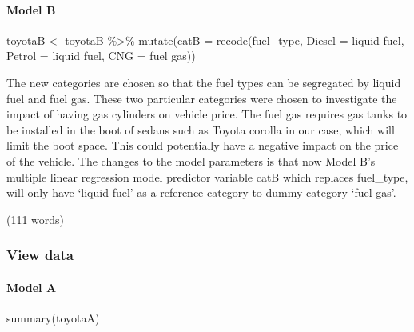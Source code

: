 \documentclass[
]{article}
\newenvironment{Shaded}{\begin{snugshade}}{\end{snugshade}}
\newcommand{\AttributeTok}[1]{\textcolor[rgb]{0.77,0.63,0.00}{#1}}
\newcommand{\FunctionTok}[1]{\textcolor[rgb]{0.00,0.00,0.00}{#1}}
\newcommand{\NormalTok}[1]{#1}
\newcommand{\OtherTok}[1]{\textcolor[rgb]{0.56,0.35,0.01}{#1}}
\newcommand{\SpecialCharTok}[1]{\textcolor[rgb]{0.00,0.00,0.00}{#1}}
\newcommand{\StringTok}[1]{\textcolor[rgb]{0.31,0.60,0.02}{#1}}
\begin{document}
\hypertarget{model-b-3}{%
\paragraph{Model B}\label{model-b-3}}

\begin{Shaded}
\begin{Highlighting}[]
\NormalTok{toyotaB }\OtherTok{\textless{}{-}}\NormalTok{ toyotaB }\SpecialCharTok{\%\textgreater{}\%}
  \FunctionTok{mutate}\NormalTok{(}\AttributeTok{catB =} \FunctionTok{recode}\NormalTok{(fuel\_type,}
                       \StringTok{\textquotesingle{}Diesel\textquotesingle{}} \OtherTok{=} \StringTok{\textquotesingle{}liquid fuel\textquotesingle{}}\NormalTok{,}
                       \StringTok{\textquotesingle{}Petrol\textquotesingle{}} \OtherTok{=} \StringTok{\textquotesingle{}liquid fuel\textquotesingle{}}\NormalTok{,}
                       \StringTok{\textquotesingle{}CNG\textquotesingle{}} \OtherTok{=} \StringTok{\textquotesingle{}fuel gas\textquotesingle{}}\NormalTok{))}
\end{Highlighting}
\end{Shaded}

The new categories are chosen so that the fuel types can be segregated
by liquid fuel and fuel gas. These two particular categories were chosen
to investigate the impact of having gas cylinders on vehicle price. The
fuel gas requires gas tanks to be installed in the boot of sedans such
as Toyota corolla in our case, which will limit the boot space. This
could potentially have a negative impact on the price of the vehicle.
The changes to the model parameters is that now Model B's multiple
linear regression model predictor variable catB which replaces
fuel\_type, will only have `liquid fuel' as a reference category to
dummy category `fuel gas'.

(111 words)

\hypertarget{view-data-1}{%
\subsubsection{View data}\label{view-data-1}}

\hypertarget{model-a-4}{%
\paragraph{Model A}\label{model-a-4}}

\begin{Shaded}
\begin{Highlighting}[]
\FunctionTok{summary}\NormalTok{(toyotaA)}
\end{Highlighting}
\end{Shaded}
\end{document}
